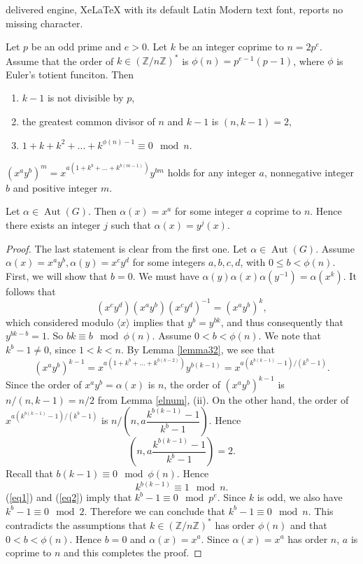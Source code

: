\documentclass[10pt,a4paper]{amsart}
\newcommand{\bbz}{{\mathbb Z}}
\newcommand{\lan}{\langle}
\newcommand{\ran}{\rangle}
\begin{document}
delivered engine, XeLaTeX with its default Latin Modern text font, reports no missing character.
\begin{lem}\label{elnum}
Let $p$ be an odd prime and $e>0$.
Let $k$ be an integer coprime to $n=2p^e$.
Assume that the order of $k \in (\bbz/n\bbz)^*$ is $\phi(n)=p^{e-1}(p-1)$, where $\phi$ is Euler's totient funciton.
Then
\begin{enumerate}
\item[(i)] $k-1$ is not divisible by $p$, 
\item[(ii)] the greatest common divisor of $n$ and $k-1$ is $(n,k-1)=2$,
\item[(iii)] $1+k+k^2+\dots + k^{\phi(n)-1} \equiv 0 \mod n$.
\end{enumerate}
\end{lem}

\begin{lem}\label{lemma32}
$(x^ay^b)^m=x^{a(1+k^b+\dots + k^{b(m-1)})}y^{bm}$ 
holds for any integer $a$, nonnegative integer $b$ and positive integer $m$.
\end{lem}

\begin{lem}\label{x}
Let $\alpha \in \operatorname{Aut}(G)$.
Then $\alpha(x) = x^a$ for some integer $a$ coprime to $n$.
Hence there exists an integer $j$ such that $\alpha(x)=y^j(x)$.
\end{lem}

\begin{proof}
The last statement is clear from the first one.
Let $\alpha \in \operatorname{Aut}(G)$.
Assume $\alpha(x)=x^ay^b, \alpha(y)=x^c y^d$ for some integers $a,b,c,d$, with $0 \leq b < \phi(n)$.
First, we will show that $b=0$.
We must have $\alpha(y)\alpha(x) \alpha(y^{-1})=\alpha(x^k)$.
It follows that 
\[(x^cy^d)(x^ay^b)(x^c y^d)^{-1}=(x^a y^b)^k, \]
which considered modulo $\lan x \ran$ implies that 
$y^b=y^{bk}$, and thus consequently that $y^{bk-b}=1$.
So $bk \equiv b \mod \phi(n)$.
Assume $0<b<\phi(n)$.
We note that $k^b -1 \neq 0$, since $1<k <n$. 
By Lemma \ref{lemma32}, we see that
\[(x^ay^b)^{k-1}=x^{a(1+k^b+ \dots + k^{b(k-2)})}y^{b(k-1)}=x^{a(k^{b(k-1)}-1)/(k^b -1)}.\]
Since the order of $x^ay^b=\alpha(x)$ is $n$, 
the order of $(x^ay^b)^{k-1}$ is $n/(n,k-1)=n/2$
from Lemma \ref{elnum}, (ii).
On the other hand, the order of 
$x^{a(k^{b(k-1)}-1)/(k^b -1)}$ is $n/\left(n, a\dfrac{k^{b(k-1)}-1}{k^b-1} \right)$.
Hence
\begin{equation}\label{eq1}
\left(n, a\dfrac{k^{b(k-1)}-1}{k^b-1} \right)=2.
\end{equation}
Recall that $b(k-1) \equiv 0 \mod \phi(n)$.
Hence
\begin{equation}\label{eq2}
k^{b(k-1)} \equiv 1 \mod n.
\end{equation}
(\ref{eq1}) and (\ref{eq2}) imply that 
$k^b -1 \equiv 0 \mod p^e$.
Since $k$ is odd, 
we also have $k^b-1 \equiv 0 \mod 2$.
Therefore we can conclude that $k^b-1
\equiv 0 \mod n$.
This contradicts the assumptions that $k \in (\bbz/n\bbz)^*$ has order $\phi(n)$ and that $0<b<\phi(n)$.
Hence $b=0$ and $\alpha(x)=x^a$.
Since $\alpha(x)=x^a$ has order $n$,
$a$ is coprime to $n$ and this completes the proof.
\end{proof}
\end{document}
